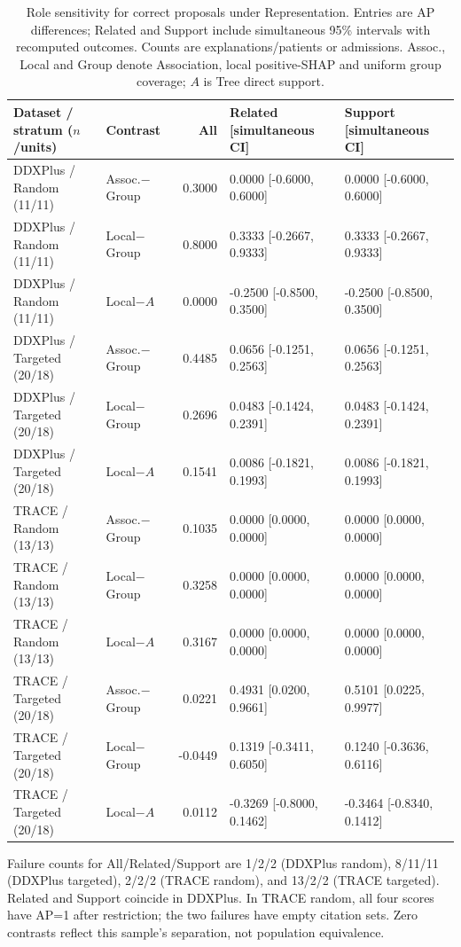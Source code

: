 \begin{table}[!tbp]\centering\scriptsize\setlength{\tabcolsep}{3pt}
\caption{Role sensitivity for correct proposals under Representation. Entries are AP differences; Related and Support include simultaneous 95\% intervals with recomputed outcomes. Counts are explanations/patients or admissions. Assoc., Local and Group denote Association, local positive-SHAP and uniform group coverage; $A$ is Tree direct support.}
\label{tab:role-contrasts}
\begin{tabular}{llrll}\toprule
Dataset / stratum ($n$/units) & Contrast & All & Related [simultaneous CI] & Support [simultaneous CI]\\\midrule
DDXPlus / Random (11/11) & Assoc.$-$Group & 0.3000 & 0.0000 [-0.6000, 0.6000] & 0.0000 [-0.6000, 0.6000] \\
DDXPlus / Random (11/11) & Local$-$Group & 0.8000 & 0.3333 [-0.2667, 0.9333] & 0.3333 [-0.2667, 0.9333] \\
DDXPlus / Random (11/11) & Local$-A$ & 0.0000 & -0.2500 [-0.8500, 0.3500] & -0.2500 [-0.8500, 0.3500] \\
DDXPlus / Targeted (20/18) & Assoc.$-$Group & 0.4485 & 0.0656 [-0.1251, 0.2563] & 0.0656 [-0.1251, 0.2563] \\
DDXPlus / Targeted (20/18) & Local$-$Group & 0.2696 & 0.0483 [-0.1424, 0.2391] & 0.0483 [-0.1424, 0.2391] \\
DDXPlus / Targeted (20/18) & Local$-A$ & 0.1541 & 0.0086 [-0.1821, 0.1993] & 0.0086 [-0.1821, 0.1993] \\
TRACE / Random (13/13) & Assoc.$-$Group & 0.1035 & 0.0000 [0.0000, 0.0000] & 0.0000 [0.0000, 0.0000] \\
TRACE / Random (13/13) & Local$-$Group & 0.3258 & 0.0000 [0.0000, 0.0000] & 0.0000 [0.0000, 0.0000] \\
TRACE / Random (13/13) & Local$-A$ & 0.3167 & 0.0000 [0.0000, 0.0000] & 0.0000 [0.0000, 0.0000] \\
TRACE / Targeted (20/18) & Assoc.$-$Group & 0.0221 & 0.4931 [0.0200, 0.9661] & 0.5101 [0.0225, 0.9977] \\
TRACE / Targeted (20/18) & Local$-$Group & -0.0449 & 0.1319 [-0.3411, 0.6050] & 0.1240 [-0.3636, 0.6116] \\
TRACE / Targeted (20/18) & Local$-A$ & 0.0112 & -0.3269 [-0.8000, 0.1462] & -0.3464 [-0.8340, 0.1412] \\
\bottomrule\end{tabular}
\par\smallskip\raggedright Failure counts for All/Related/Support are 1/2/2 (DDXPlus random), 8/11/11 (DDXPlus targeted), 2/2/2 (TRACE random), and 13/2/2 (TRACE targeted). Related and Support coincide in DDXPlus. In TRACE random, all four scores have AP=1 after restriction; the two failures have empty citation sets. Zero contrasts reflect this sample's separation, not population equivalence.
\end{table}
